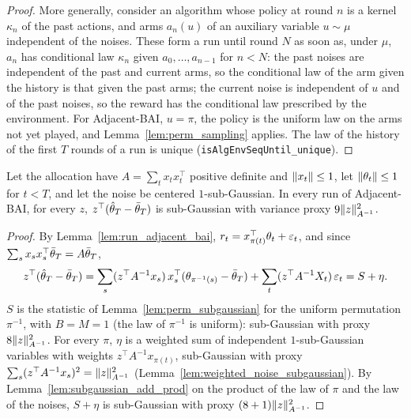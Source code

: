 \begin{proof}
  \leanok
  More generally, consider an algorithm whose policy at round $n$ is a kernel $\kappa_n$ of the
  past actions, and arms $a_n(u)$ of an auxiliary variable $u \sim \mu$ independent of the noises.
  These form a run until round $N$ as soon as, under $\mu$, $a_n$ has conditional law $\kappa_n$
  given $a_0, \dots, a_{n-1}$ for $n < N$: the past noises are independent of the past and current
  arms, so the conditional law of the arm given the history is that given the past arms; the
  current noise is independent of $u$ and of the past noises, so the reward has the conditional
  law prescribed by the environment. For Adjacent-BAI, $u = \pi$, the policy is the uniform law on
  the arms not yet played, and Lemma~\ref{lem:perm_sampling} applies. The law of the history of the
  first $T$ rounds of a run is unique (\texttt{isAlgEnvSeqUntil\_unique}).
\end{proof}

\begin{lemma}
  \label{lem:ls_subgaussian}
  \leanok
  Let the allocation have $A = \sum_t x_t x_t^\top$ positive definite and $\lVert x_t \rVert \le 1$, let
  $\lVert \theta_t \rVert \le 1$ for $t < T$, and let the noise be centered $1$-sub-Gaussian. In every run of
  Adjacent-BAI, for every $z$, $z^\top(\hat{\theta}_T - \bar{\theta}_T)$ is sub-Gaussian with variance
  proxy $9 \lVert z \rVert^2_{A^{-1}}$.
\end{lemma}

\begin{proof}
  \leanok
  By Lemma~\ref{lem:run_adjacent_bai}, $r_t = x_{\pi(t)}^\top \theta_t + \varepsilon_t$, and since
  $\sum_s x_s x_s^\top \bar{\theta}_T = A \bar{\theta}_T$,
  \[
    z^\top(\hat{\theta}_T - \bar{\theta}_T)
    = \sum_s (z^\top A^{-1} x_s)\, x_s^\top (\theta_{\pi^{-1}(s)} - \bar{\theta}_T)
      + \sum_t (z^\top A^{-1} X_t)\, \varepsilon_t = S + \eta.
  \]
  $S$ is the statistic of Lemma~\ref{lem:perm_subgaussian} for the uniform permutation $\pi^{-1}$,
  with $B = M = 1$ (the law of $\pi^{-1}$ is uniform): sub-Gaussian with proxy
  $8 \lVert z \rVert^2_{A^{-1}}$. For every $\pi$, $\eta$ is a weighted sum of independent
  $1$-sub-Gaussian variables with weights $z^\top A^{-1} x_{\pi(t)}$, sub-Gaussian with proxy
  $\sum_s (z^\top A^{-1} x_s)^2 = \lVert z \rVert^2_{A^{-1}}$
  (Lemma~\ref{lem:weighted_noise_subgaussian}). By Lemma~\ref{lem:subgaussian_add_prod} on the
  product of the law of $\pi$ and the law of the noises, $S + \eta$ is sub-Gaussian with proxy
  $(8 + 1) \lVert z \rVert^2_{A^{-1}}$.
\end{proof}

